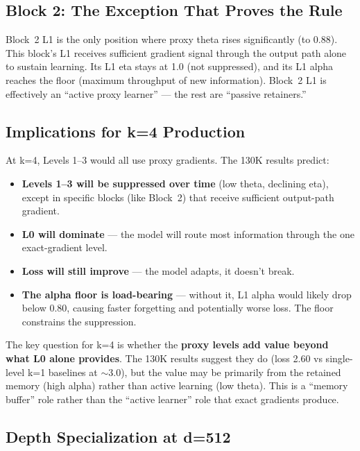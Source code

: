 \documentclass[11pt,a4paper]{article}
\begin{document}
\subsection{Block 2: The Exception That Proves the Rule}

Block~2 L1 is the only position where proxy theta rises significantly (to 0.88). This block's L1
receives sufficient gradient signal through the output path alone to sustain learning. Its L1 eta
stays at 1.0 (not suppressed), and its L1 alpha reaches the floor (maximum throughput of new
information). Block~2 L1 is effectively an ``active proxy learner'' --- the rest are ``passive retainers.''

\subsection{Implications for k=4 Production}

At k=4, Levels 1--3 would all use proxy gradients. The 130K results predict:
\begin{itemize}
    \item \textbf{Levels 1--3 will be suppressed over time} (low theta, declining eta), except in
          specific blocks (like Block~2) that receive sufficient output-path gradient.
    \item \textbf{L0 will dominate} --- the model will route most information through the one exact-gradient level.
    \item \textbf{Loss will still improve} --- the model adapts, it doesn't break.
    \item \textbf{The alpha floor is load-bearing} --- without it, L1 alpha would likely drop below 0.80,
          causing faster forgetting and potentially worse loss. The floor constrains the suppression.
\end{itemize}

\noindent The key question for k=4 is whether the \textbf{proxy levels add value beyond what L0 alone
provides}. The 130K results suggest they do (loss 2.60 vs single-level k=1 baselines at $\sim$3.0),
but the value may be primarily from the retained memory (high alpha) rather than active learning
(low theta). This is a ``memory buffer'' role rather than the ``active learner'' role that exact
gradients produce.

\subsection{Depth Specialization at d=512}
\end{document}
